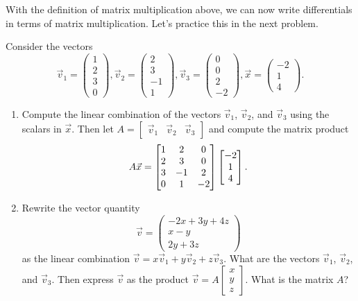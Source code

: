 With the definition of matrix multiplication above, we can now write differentials in terms of matrix multiplication. Let's practice this in the next problem.
\begin{problem}
Consider the vectors 
$$
\vec v_1 = 
\begin{pmatrix}
 1\\2\\3\\0
\end{pmatrix},
 \vec v_2 = 
\begin{pmatrix}
 2\\3\\-1\\1
\end{pmatrix},
\vec v_3 = 
\begin{pmatrix}
 0\\0\\2\\-2
\end{pmatrix},
\vec x = 
\begin{pmatrix}
 -2\\1\\4
\end{pmatrix}.
$$
\begin{enumerate}
 \item Compute the linear combination of the vectors $\vec v_1$, $\vec v_2$, and $\vec v_3$ using the scalars in $\vec x$. 
 Then let
$A =
\begin{bmatrix}
 \vec v_1&
 \vec v_2&
 \vec v_3
\end{bmatrix}
$ 
and compute the matrix product 
$$
A\vec x = 
\begin{bmatrix}
 \begin{matrix} 1\\2\\3\\0 \end{matrix}&
 \begin{matrix} 2\\3\\-1\\1 \end{matrix}&
 \begin{matrix} 0\\0\\2\\-2 \end{matrix}
\end{bmatrix}
\begin{bmatrix}
 -2\\1\\4
\end{bmatrix}.
$$
 \item 
Rewrite the vector quantity
$$\vec v = 
\begin{pmatrix}
 -2x+3y+4z\\x-y\\2y+3z
\end{pmatrix}
$$
as the linear combination $\vec v = x\vec v_1+y\vec v_2+z\vec v_3$. What are the vectors $\vec v_1$, $\vec v_2$, and $\vec v_3$.  
%
Then express $\vec v$ as the product $\vec v = A\begin{bmatrix}x\\y\\z\end{bmatrix}.$  What is the matrix $A$?  
\end{enumerate}
\end{problem}




